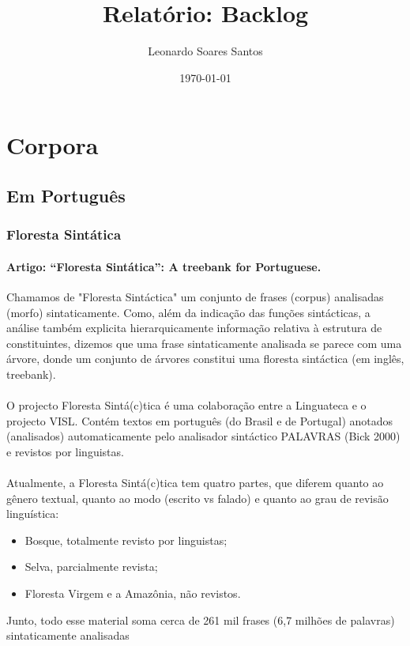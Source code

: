 \documentclass[a4paper, 10pt]{article}
\begin{document}
	\title{Relatório: Backlog}
	\author{Leonardo Soares Santos}
	\date{\today}
	
	\maketitle	
	\section{Corpora}
    	\subsection{Em Português}
        	\subsubsection{Floresta Sintática}
                \paragraph{Artigo: “Floresta Sintática”: A treebank for Portuguese.}
                Chamamos de "Floresta Sintáctica" um conjunto de frases (corpus) analisadas 
            	(morfo) sintaticamente. Como, além da indicação das funções sintácticas, a análise também explicita hierarquicamente 
            	informação relativa à estrutura de constituintes, dizemos que uma frase sintaticamente analisada se parece com uma árvore, donde um conjunto de árvores constitui uma floresta sintáctica (em inglês, treebank).
            	\paragraph{} 
            	O projecto Floresta Sintá(c)tica é uma colaboração entre a Linguateca e o projecto VISL. Contém textos em português (do Brasil e de Portugal) anotados (analisados) automaticamente pelo analisador sintáctico PALAVRAS (Bick 2000) e revistos por linguistas.
            	\paragraph{} 
            	Atualmente, a Floresta Sintá(c)tica tem quatro partes, que diferem quanto ao gênero textual, quanto ao modo (escrito vs falado) e quanto ao grau de revisão linguística: 
            \begin{itemize}
				\item Bosque, totalmente revisto por linguistas;
                \item Selva, parcialmente revista;
                \item Floresta Virgem e a Amazônia, não revistos.
			\end{itemize}
             Junto, todo esse material soma cerca de 261 mil frases (6,7 milhões de palavras) sintaticamente analisadas
\end{document}
